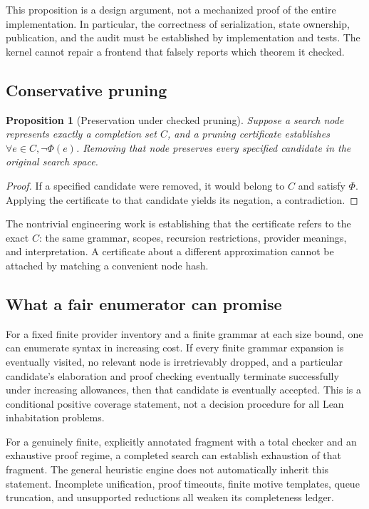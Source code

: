\documentclass[11pt,letterpaper]{article}
\newcommand{\Spec}{\Phi}
\newtheorem{proposition}{Proposition}[section]
\theoremstyle{definition}
\theoremstyle{remark}
\begin{document}
This proposition is a design argument, not a mechanized proof of the entire implementation. In particular, the correctness of serialization, state ownership, publication, and the audit must be established by implementation and tests. The kernel cannot repair a frontend that falsely reports which theorem it checked.

\subsection{Conservative pruning}

\begin{proposition}[Preservation under checked pruning]
Suppose a search node represents exactly a completion set $C$, and a pruning certificate establishes $\forall e\in C,\neg\Spec(e)$. Removing that node preserves every specified candidate in the original search space.
\end{proposition}
\begin{proof}
If a specified candidate were removed, it would belong to $C$ and satisfy $\Spec$. Applying the certificate to that candidate yields its negation, a contradiction.
\end{proof}

The nontrivial engineering work is establishing that the certificate refers to the exact $C$: the same grammar, scopes, recursion restrictions, provider meanings, and interpretation. A certificate about a different approximation cannot be attached by matching a convenient node hash.

\subsection{What a fair enumerator can promise}

For a fixed finite provider inventory and a finite grammar at each size bound, one can enumerate syntax in increasing cost. If every finite grammar expansion is eventually visited, no relevant node is irretrievably dropped, and a particular candidate's elaboration and proof checking eventually terminate successfully under increasing allowances, then that candidate is eventually accepted. This is a conditional positive coverage statement, not a decision procedure for all Lean inhabitation problems.

For a genuinely finite, explicitly annotated fragment with a total checker and an exhaustive proof regime, a completed search can establish exhaustion of that fragment. The general heuristic engine does not automatically inherit this statement. Incomplete unification, proof timeouts, finite motive templates, queue truncation, and unsupported reductions all weaken its completeness ledger.
\end{document}
